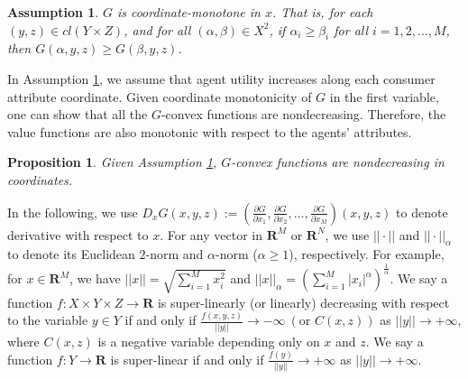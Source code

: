 \documentclass[a4paper, 11pt]{amsart}
\numberwithin{equation}{section}
\theoremstyle{plain}
\newtheorem{proposition}[theorem]{Proposition}
\newtheorem{assumption}{Assumption}
\theoremstyle{definition}
\theoremstyle{remark}
\newcommand{\R}{\mathbf{R}}
\begin{document}



\begin{comment}
	{ is the so-called twist condition which is the similar/dual to but much less restrictive than the generalized single crossing condition proposed by McAfee-McMillan \cite{McAfeeMcMillan88}. Comparing to Figalli-Kim-McCann \cite{FigalliKimMcCann11}}\medskip
\end{comment}


\begin{assumption}\label{assmp:Gcoordinate-monotone}
	$G$ is coordinate-monotone in $x$. That is, for each $(y,z)\in cl(Y\times Z)$, and for all $ (\alpha, \beta) \in X^2$, if $\alpha_i\ge \beta_i$ for all $ i=1,2,...,M$, then $G(\alpha,y,z)\ge G(\beta, y,z)$.
\end{assumption}


In Assumption \ref{assmp:Gcoordinate-monotone}, we assume that agent utility increases along each consumer attribute coordinate. Given coordinate monotonicity of $G$ in the first variable, one can show that all the $G$-convex functions are nondecreasing. Therefore, the value functions are also monotonic with respect to the agents' attributes.\medskip

\begin{proposition}\label{nondecreasing}
	Given Assumption \ref{assmp:Gcoordinate-monotone}, $G$-convex functions are nondecreasing in coordinates.
\end{proposition}



 {In the following, we use  $D_x G(x,y,z) := \left(\frac{\partial G}{\partial x_1}, \frac{\partial G}{\partial x_2}, \dots, \frac{\partial G}{\partial x_M}\right)(x,y,z)$ to denote derivative with respect to $x$. For any vector in $\R^M$ or $\R^N$, we use $||\cdot||$ and $||\cdot||_{\alpha}$ to denote its Euclidean  $2$-norm and $\alpha$-norm ($\alpha \ge 1$), respectively. For example, for $x\in \R^M$, we have $||x|| = \sqrt{\sum_{i=1}^{M} x_i^2}$ and $||x||_{\alpha} = \left(\sum_{i=1}^{M} |x_i|^{\alpha}\right)^{\frac{1}{\alpha}}$.} {\color{purple} We say a function $f: X \times Y \times Z \longrightarrow \R$ is super-linearly (or linearly) decreasing with respect to the variable $y\in Y$ if and only if $\frac{f(x,y,z)}{||y||} \longrightarrow -\infty ~(\text{or }C(x,z))$ as $||y||\longrightarrow +\infty$, where $C(x,z)$ is a negative variable depending only on $x$ and $z$. We say a function $f: Y\longrightarrow \R$ is super-linear if and only if $\frac{f(y)}{||y||} \longrightarrow +\infty$ as $||y||\longrightarrow +\infty$.}\medskip
 
\end{document}
